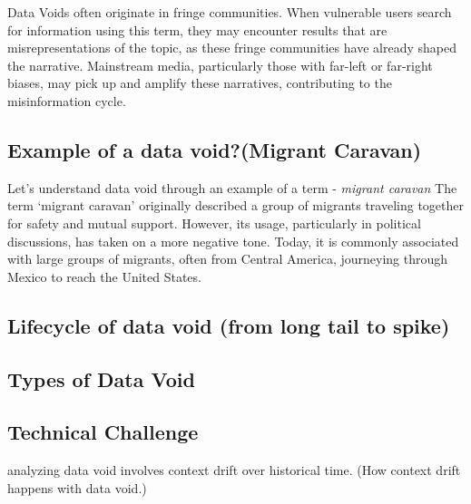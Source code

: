 Data Voids often originate in fringe communities.
When vulnerable users search for information using this term, they may encounter results that are misrepresentations of the topic, as these fringe communities have already shaped the narrative.
Mainstream media, particularly those with far-left or far-right biases, may pick up and amplify these narratives, contributing to the misinformation cycle.

\subsection{Example of a data void?(Migrant Caravan)}
Let's understand data void through an example of a term - \emph{migrant caravan}
The term ‘migrant caravan’ originally described a group of migrants traveling together for safety and mutual support.
However, its usage, particularly in political discussions, has taken on a more negative tone.
Today, it is commonly associated with large groups of migrants, often from Central America, journeying through Mexico to reach the United States.


\subsection{Lifecycle of data void (from long tail to spike)}
\subsection{Types of Data Void}
\subsection{Technical Challenge}
analyzing data void involves context drift over historical time. (How context drift happens with data void.)
